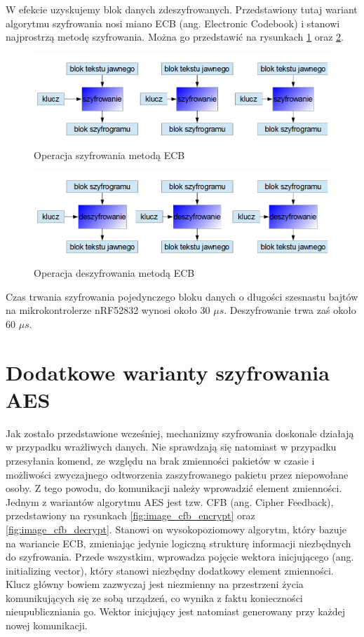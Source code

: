 W efekcie uzyskujemy blok danych zdeszyfrowanych.
Przedstawiony tutaj wariant algorytmu szyfrowania nosi miano ECB (ang. Electronic Codebook) i stanowi najprostrzą metodę szyfrowania. Można go przedstawić na rysunkach \ref{fig:image_ecb_encrypt} oraz \ref{fig:image_ecb_decrypt}.

	\begin{figure}[h]
		\centering
		\includegraphics[width=15cm]{img/com_security/ECB_szyfrowanie.png}
		\caption{Operacja szyfrowania metodą ECB}
		\label{fig:image_ecb_encrypt}
	\end{figure}
	
	\begin{figure}[h]
		\centering
		\includegraphics[width=15cm]{img/com_security/ECB_deszyfrowanie.png}
		\caption{Operacja deszyfrowania metodą ECB}
		\label{fig:image_ecb_decrypt}
	\end{figure}
	
Czas trwania szyfrowania pojedynczego bloku danych o długości szesnastu bajtów na mikrokontrolerze nRF52832  wynosi około 30 $\mu s$. Deszyfrowanie trwa zaś około 60 $\mu s$.


\section{Dodatkowe warianty szyfrowania AES}

Jak zostało przedstawione wcześniej, mechanizmy szyfrowania doskonale działają w przypadku wrażliwych danych. Nie sprawdzają się natomiast w przypadku przesyłania komend, ze względu na brak zmienności pakietów w czasie i możliwości zwyczajnego odtworzenia zaszyfrowanego pakietu przez niepowołane osoby. Z tego powodu, do komunikacji należy wprowadzić element zmienności.
Jednym z wariantów algorytmu AES jest tzw. CFB (ang. Cipher Feedback), przedstawiony na rysunkach \ref{fig:image_cfb_encrypt} oraz \ref{fig:image_cfb_decrypt}. Stanowi on wysokopoziomowy algorytm, który bazuje na wariancie ECB, zmieniając jedynie logiczną strukturę informacji niezbędnych do szyfrowania. Przede wszystkim, wprowadza pojęcie wektora inicjującego (ang. initializing vector), który stanowi niezbędny dodatkowy element zmienności. Klucz główny bowiem zazwyczaj jest niezmienny na przestrzeni życia komunikujących się ze sobą urządzeń, co wynika z faktu konieczności nieupubliczniania go. Wektor inicjujący jest natomiast generowany przy każdej nowej komunikacji. 

